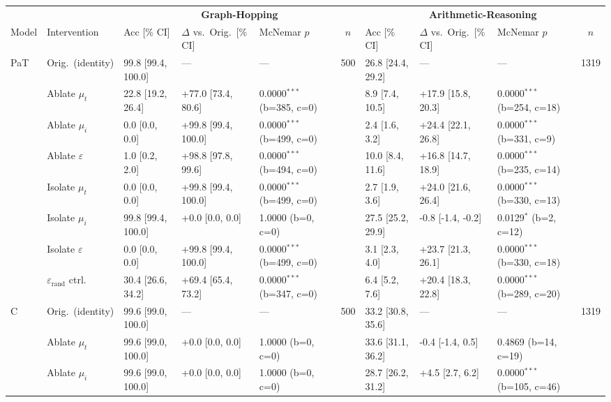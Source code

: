 \begin{table}[h!]
\centering
\tiny
\setlength{\tabcolsep}{4pt}
\begin{tabular}{ll lllc lllc}
\toprule
 & & \multicolumn{4}{c}{\textbf{Graph-Hopping}} & \multicolumn{4}{c}{\textbf{Arithmetic-Reasoning}} \\
\cmidrule(lr){3-6} \cmidrule(lr){7-10}
Model & Intervention & Acc [\% CI] & $\Delta$ vs.\ Orig.\ [\% CI] & McNemar $p$ & $n$ & Acc [\% CI] & $\Delta$ vs.\ Orig.\ [\% CI] & McNemar $p$ & $n$ \\
\midrule
\multirow{8}{*}{PaT} & Orig.\ (identity) & 99.8 [99.4, 100.0] & --- & --- & 500 & 26.8 [24.4, 29.2] & --- & --- & 1319 \\
 & Ablate $\mu_t$ & 22.8 [19.2, 26.4] & +77.0 [73.4, 80.6] & 0.0000$^{***}$ (b=385, c=0) &  & 8.9 [7.4, 10.5] & +17.9 [15.8, 20.3] & 0.0000$^{***}$ (b=254, c=18) &  \\
 & Ablate $\mu_i$ & 0.0 [0.0, 0.0] & +99.8 [99.4, 100.0] & 0.0000$^{***}$ (b=499, c=0) &  & 2.4 [1.6, 3.2] & +24.4 [22.1, 26.8] & 0.0000$^{***}$ (b=331, c=9) &  \\
 & Ablate $\varepsilon$ & 1.0 [0.2, 2.0] & +98.8 [97.8, 99.6] & 0.0000$^{***}$ (b=494, c=0) &  & 10.0 [8.4, 11.6] & +16.8 [14.7, 18.9] & 0.0000$^{***}$ (b=235, c=14) &  \\
 & Isolate $\mu_t$ & 0.0 [0.0, 0.0] & +99.8 [99.4, 100.0] & 0.0000$^{***}$ (b=499, c=0) &  & 2.7 [1.9, 3.6] & +24.0 [21.6, 26.4] & 0.0000$^{***}$ (b=330, c=13) &  \\
 & Isolate $\mu_i$ & 99.8 [99.4, 100.0] & +0.0 [0.0, 0.0] & 1.0000 (b=0, c=0) &  & 27.5 [25.2, 29.9] & -0.8 [-1.4, -0.2] & 0.0129$^{*}$ (b=2, c=12) &  \\
 & Isolate $\varepsilon$ & 0.0 [0.0, 0.0] & +99.8 [99.4, 100.0] & 0.0000$^{***}$ (b=499, c=0) &  & 3.1 [2.3, 4.0] & +23.7 [21.3, 26.1] & 0.0000$^{***}$ (b=330, c=18) &  \\
 & $\varepsilon_\mathrm{rand}$ ctrl. & 30.4 [26.6, 34.2] & +69.4 [65.4, 73.2] & 0.0000$^{***}$ (b=347, c=0) &  & 6.4 [5.2, 7.6] & +20.4 [18.3, 22.8] & 0.0000$^{***}$ (b=289, c=20) &  \\
\cmidrule(lr){2-10}
\multirow{8}{*}{C} & Orig.\ (identity) & 99.6 [99.0, 100.0] & --- & --- & 500 & 33.2 [30.8, 35.6] & --- & --- & 1319 \\
 & Ablate $\mu_t$ & 99.6 [99.0, 100.0] & +0.0 [0.0, 0.0] & 1.0000 (b=0, c=0) &  & 33.6 [31.1, 36.2] & -0.4 [-1.4, 0.5] & 0.4869 (b=14, c=19) &  \\
 & Ablate $\mu_i$ & 99.6 [99.0, 100.0] & +0.0 [0.0, 0.0] & 1.0000 (b=0, c=0) &  & 28.7 [26.2, 31.2] & +4.5 [2.7, 6.2] & 0.0000$^{***}$ (b=105, c=46) &  \\

\end{tabular}
\end{table}
